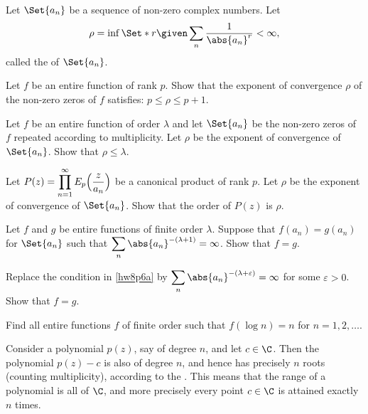 \begin{definition}
	Let $\Set{a_n}$ be a sequence of non-zero complex numbers.
	Let
	\[
		\rho = \inf\Set*{r \given \sum_n \frac{1}{\abs{a_n}^r} < \infty},
	\]
	called the  of $\Set{a_n}$.
\end{definition}

\begin{exercise}
	\begin{parts}
		\item Let $f$ be an entire function of rank $p$.
		Show that the exponent of convergence $\rho$ of the non-zero zeros of $f$ satisfies: $p \leq \rho \leq p + 1$.

		\item Let $f$ be an entire function of order $\lambda$ and let $\Set{a_n}$ be the non-zero zeros of $f$ repeated according to multiplicity.
		Let $\rho$ be the exponent of convergence of $\Set{a_n}$.
		Show that $\rho \leq \lambda$.

		\item Let $\displaystyle P(z) = \prod_{n = 1}^\infty E_p\Bigl( \frac{z}{a_n} \Bigr)$ be a canonical product of rank $p$.
		Let $\rho$ be the exponent of convergence of $\Set{a_n}$.
		Show that the order of $P(z)$ is $\rho$. \qedhere
	\end{parts}
\end{exercise}

\begin{exercise}\label{hw8p6}
	\begin{parts}
		\item\label{hw8p6a} Let $f$ and $g$ be entire functions of finite order $\lambda$.
		Suppose that $f(a_n) = g(a_n)$ for $\Set{a_n}$ such that $\displaystyle \sum_n \abs{a_n}^{-(\lambda + 1)} = \infty$.
		Show that $f = g$.

		\item\label{hw8p6b} Replace the condition in \ref{hw8p6a} by $\displaystyle \sum_n \abs{a_n}^{-(\lambda + \varepsilon)} = \infty$ for some $\varepsilon > 0$.
		Show that $f = g$.

		\item Find all entire functions $f$ of finite order such that $f(\log n) = n$ for $n = 1, 2, \dots$. \qedhere
	\end{parts}
\end{exercise}


Consider a polynomial $p(z)$, say of degree $n$, and let $c \in \C$.
Then the polynomial $p(z) - c$ is also of degree $n$, and hence has precisely $n$ roots (counting multiplicity), according to the .
This means that the range of a polynomial is all of $\C$, and more precisely every point $c \in \C$ is attained exactly $n$ times.

